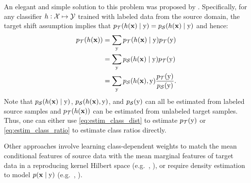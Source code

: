 An elegant and simple solution to this problem was proposed by \citet{Lipton2018}. Specifically, for any classifier $h: {\mathcal{X}} \mapsto {\mathcal{Y}}$ trained with labeled data from the source domain, the target shift assumption implies that $p_{{\mathcal{T}}}(h({\mathbf{x}}) \mid {\textnormal{y}}) = p_{{\mathcal{S}}}(h({\mathbf{x}}) \mid {\textnormal{y}})$ and hence:
\begin{align}
    p_{\gT}(h(\rvx)) &= \sum_{\ry} p_{\gT}(h(\rvx) \mid \ry) p_{\gT}(\ry) \nonumber\\
    \allowdisplaybreaks
    &= \sum_{\ry} p_{\gS}(h(\rvx) \mid \ry) p_{\gT}(\ry) \label{eq:estim_class_dist}\\
    \allowdisplaybreaks
    &= \sum_{\ry} p_{\gS}(h(\rvx), \ry) \frac{p_{\gT}(\ry)}{p_{\gS}(\ry)}. \label{eq:estim_class_ratio}
\end{align}
Note that $p_{{\mathcal{S}}}(h({\mathbf{x}}) \mid {\textnormal{y}})$, $p_{{\mathcal{S}}}(h({\mathbf{x}}), {\textnormal{y}})$, and $p_{{\mathcal{S}}}({\textnormal{y}})$ can all be estimated from labeled source samples and $p_{{\mathcal{T}}}(h({\mathbf{x}}))$ can be estimated from unlabeled target samples. Thus, one can either use \eqref{eq:estim_class_dist} to estimate $p_{{\mathcal{T}}}({\textnormal{y}})$ or \eqref{eq:estim_class_ratio} to estimate class ratios directly.

Other approaches involve learning class-dependent weights to match the mean conditional features of source data with the mean marginal features of target data in a reproducing kernel Hilbert space (e.g.\  \citet{Iyer2004}, \citet{Zhang2013}), or require density estimation to model $p({\mathbf{x}} \mid {\textnormal{y}})$ (e.g.\ \citet{Chan2005}, \citet{Storkey2009}).

